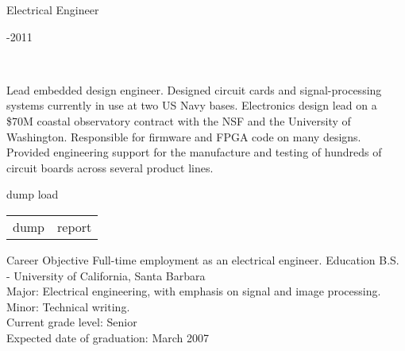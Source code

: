 \documentclass[letterpaper, 10pt]{article}
\begin{document}
\begin{minipage}[t]{0.5\textwidth}
\noindent \begin{minipage}[t]{0.5\textwidth}\noindent \raggedright Electrical Engineer\\ \end{minipage}
\noindent \begin{minipage}[t]{0.5\textwidth}\noindent {}-2011\\ \end{minipage}\\
\par
Lead embedded design engineer. Designed circuit cards and signal-processing systems currently in use at two US Navy bases. Electronics design lead on a \$70M coastal observatory contract with the NSF and the University of Washington. Responsible for firmware and FPGA code on many designs. Provided engineering support for the manufacture and testing of hundreds of circuit boards across several product lines.

\end{minipage}

\begingroup \raggedright dump \endgroup \begingroup \raggedleft load\endgroup


\begin{tabular}{l | r} %
dump & report\\

\end{tabular}


\par{}

\begingroup
\raggedleft \noindent {}
\raggedright \noindent {}
\endgroup

\nrcsinglesection
{Career Objective}
{Full-time employment as an electrical engineer.}
\nrcsinglesection
{Education}
{B.S. - University of California, Santa Barbara \\
Major: Electrical engineering, with emphasis on signal and image processing.\\
Minor: Technical writing. \\
Current grade level: Senior \\
Expected date of graduation: March 2007 \\}
\end{document}
